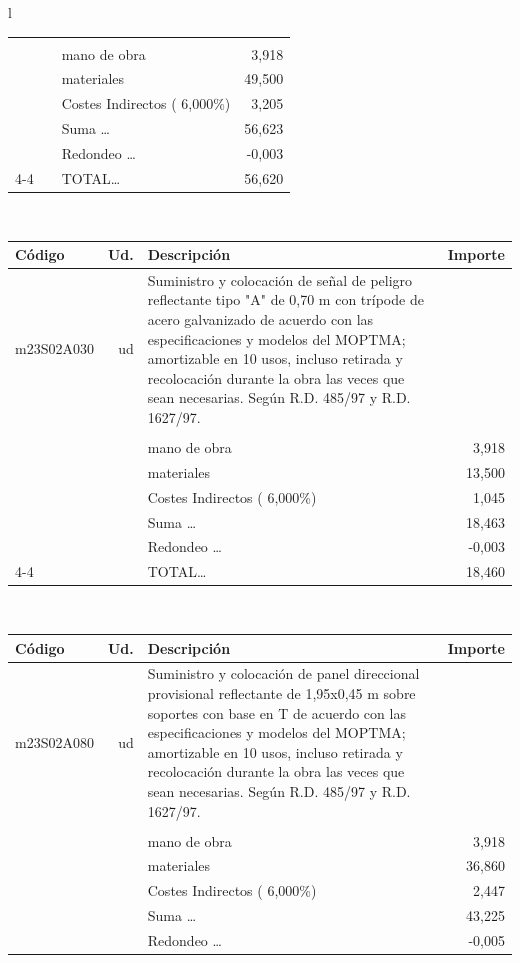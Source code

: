 \documentclass{book}%
\begin{document}
\begin{longtable}{l}
\begin{tabular}{l r p{60mm} r}
&&&\\%
&&mano de obra&     3,918\\%
&&materiales&    49,500\\%
&&Costes Indirectos (     6,000\%)&     3,205\\%
&&Suma \ldots&    56,623\\%
&&Redondeo \ldots&    {-}0,003\\%
\cline{4-4}%
&&TOTAL\ldots&    56,620\\%
\end{tabular}\\%
\begin{tabular}{l r p{60mm} r}%
Código&Ud.&Descripción&Importe\\%
\hline%
m23S02A030&ud&Suministro y colocación de señal de peligro reflectante tipo "A" de 0,70 m con trípode de acero galvanizado de acuerdo con las especificaciones y modelos del MOPTMA; amortizable en 10 usos, incluso retirada y recolocación durante la obra las veces que sean necesarias. Según R.D. 485/97 y R.D. 1627/97.&\\%
&&&\\%
&&mano de obra&     3,918\\%
&&materiales&    13,500\\%
&&Costes Indirectos (     6,000\%)&     1,045\\%
&&Suma \ldots&    18,463\\%
&&Redondeo \ldots&    {-}0,003\\%
\cline{4-4}%
&&TOTAL\ldots&    18,460\\%
\end{tabular}\\%
\begin{tabular}{l r p{60mm} r}%
Código&Ud.&Descripción&Importe\\%
\hline%
m23S02A080&ud&Suministro y colocación de panel direccional provisional reflectante de 1,95x0,45 m sobre soportes con base en T de acuerdo con las especificaciones y modelos del MOPTMA; amortizable en 10 usos, incluso retirada y recolocación durante la obra las veces que sean necesarias. Según R.D. 485/97 y R.D. 1627/97.&\\%
&&&\\%
&&mano de obra&     3,918\\%
&&materiales&    36,860\\%
&&Costes Indirectos (     6,000\%)&     2,447\\%
&&Suma \ldots&    43,225\\%
&&Redondeo \ldots&    {-}0,005\\%

\end{tabular}
\end{longtable}
\end{document}
